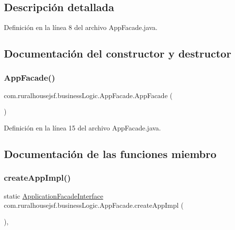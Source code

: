 \subsection{Descripción detallada}


Definición en la línea 8 del archivo App\+Facade.\+java.



\subsection{Documentación del constructor y destructor}
\mbox{\label{classcom_1_1ruralhousejsf_1_1business_logic_1_1_app_facade_a06c4cf71ecdbda8e7abccdd21d84d549}} 
\subsubsection{\texorpdfstring{AppFacade()}{AppFacade()}}
{\footnotesize\ttfamily com.\+ruralhousejsf.\+business\+Logic.\+App\+Facade.\+App\+Facade (\begin{DoxyParamCaption}{ }\end{DoxyParamCaption})\hspace{0.3cm}{\ttfamily [private]}}



Definición en la línea 15 del archivo App\+Facade.\+java.



\subsection{Documentación de las funciones miembro}
\mbox{\label{classcom_1_1ruralhousejsf_1_1business_logic_1_1_app_facade_a8f4d396c7d2ce6ba084554d68385fc34}} 
\subsubsection{\texorpdfstring{createAppImpl()}{createAppImpl()}}
{\footnotesize\ttfamily static \mbox{\hyperlink{interfacecom_1_1ruralhousejsf_1_1business_logic_1_1_application_facade_interface}{Application\+Facade\+Interface}} com.\+ruralhousejsf.\+business\+Logic.\+App\+Facade.\+create\+App\+Impl (\begin{DoxyParamCaption}{ }\end{DoxyParamCaption})\hspace{0.3cm}{\ttfamily [static]}, {\ttfamily [private]}}



